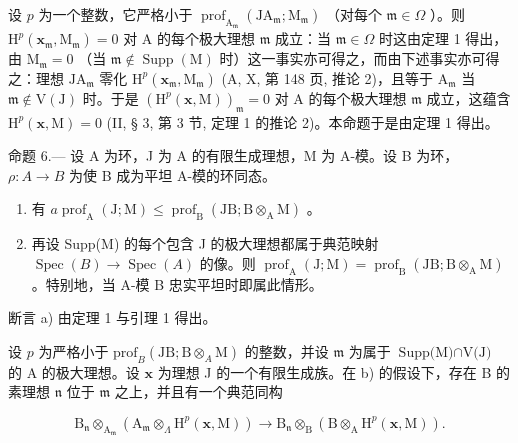 设 \(p\) 为一个整数，它严格小于 \(\operatorname{prof}_{\mathrm{A}_{\mathfrak{m}}}\left(\mathrm{JA}_{\mathfrak{m}};\mathrm{M}_{\mathfrak{m}}\right)\) （对每个 \(\mathfrak{m}\in\Omega\) ）。则 \(\mathrm{H}^{p}\left(\mathbf{x}_{\mathfrak{m}},\mathrm{M}_{\mathfrak{m}}\right)=0\) 对 A 的每个极大理想 \(\mathfrak{m}\) 成立：当 \(\mathfrak{m}\in\Omega\) 时这由定理 1 得出，由 \(\mathrm{M}_{\mathfrak{m}}=0\) （当 \(\mathfrak{m}\notin\operatorname{Supp}(\mathrm{M})\) 时）这一事实亦可得之，而由下述事实亦可得之：理想 \(\mathrm{JA}_{\mathfrak{m}}\) 零化 \(\mathrm{H}^{p}\left(\mathbf{x}_{\mathfrak{m}},\mathrm{M}_{\mathfrak{m}}\right)\) (A, X, 第 148 页, 推论 2)，且等于 \(\mathrm{A}_{\mathfrak{m}}\) 当 \(\mathfrak{m}\notin\mathrm{V}(\mathrm{J})\) 时。于是 \(\left(\mathrm{H}^{p}(\mathbf{x},\mathrm{M})\right)_{\mathfrak{m}}=0\) 对 A 的每个极大理想 \(\mathfrak{m}\) 成立，这蕴含 \(\mathrm{H}^{p}(\mathbf{x},\mathrm{M})=0\) (II, § 3, 第 3 节, 定理 1 的推论 2)。本命题于是由定理 1 得出。

命题 6.--- 设 A 为环，J 为 A 的有限生成理想，M 为 A-模。设 B 为环，\(\rho: A \to B\) 为使 B 成为平坦 A-模的环同态。

\begin{enumerate}
\def\labelenumi{\alph{enumi})}
\item
  有 \(a \operatorname{prof}_{\mathrm{A}}(\mathrm{J}; \mathrm{M}) \leqslant \operatorname{prof}_{\mathrm{B}}(\mathrm{JB}; \mathrm{B} \otimes_{\mathrm{A}} \mathrm{M})\) 。
\item
  再设 Supp(M) 的每个包含 J 的极大理想都属于典范映射 \(\operatorname{Spec}(B) \to \operatorname{Spec}(A)\) 的像。则 \(\operatorname{prof}_{\mathrm{A}}(\mathrm{J}; \mathrm{M}) = \operatorname{prof}_{\mathrm{B}}(\mathrm{JB}; \mathrm{B} \otimes_{\mathrm{A}} \mathrm{M})\) 。特别地，当 A-模 B 忠实平坦时即属此情形。
\end{enumerate}

断言 a) 由定理 1 与引理 1 得出。

设 \(p\) 为严格小于 \(\text{prof}_B(\text{JB};\text{B} \otimes_A \text{M})\) 的整数，并设 \(\mathfrak{m}\) 为属于 \(\text{Supp(M)} \cap \text{V(J)}\) 的 A 的极大理想。设 \(\mathbf{x}\) 为理想 J 的一个有限生成族。在 b) 的假设下，存在 B 的素理想 \(\mathfrak{n}\) 位于 \(\mathfrak{m}\) 之上，并且有一个典范同构

\[
\mathrm{B} _ {\mathfrak {n}} \otimes_ {\mathrm{A} _ {\mathfrak {m}}} \left(\mathrm{A} _ {\mathfrak {m}} \otimes_ {\Lambda} \mathrm{H} ^ {p} (\mathbf {x}, \mathrm{M})\right) \longrightarrow \mathrm{B} _ {\mathfrak {n}} \otimes_ {\mathrm{B}} \left(\mathrm{B} \otimes_ {\mathrm{A}} \mathrm{H} ^ {p} (\mathbf {x}, \mathrm{M})\right).
\]

